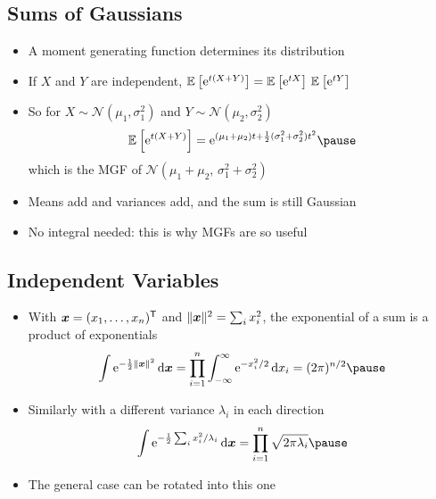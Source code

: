 \begin{slide}
\section[-1]{Sums of Gaussians}

\begin{PauseHighLight}
  \begin{itemize}
  \item A moment generating function determines its distribution\pause
  \item If $X$ and $Y$ are independent,
    $\mathbb{E}_{}\left[ {\rm e}^{t(X+Y)} \right] = \mathbb{E}_{}\left[ {\rm e}^{tX} \right]\,\mathbb{E}_{}\left[ {\rm e}^{tY} \right]$\pause
  \item So for $X\sim\mathcal{N}(\mu_1,\sigma_1^2)$ and
    $Y\sim\mathcal{N}(\mu_2,\sigma_2^2)$
    \begin{align*}
      \av{\e{t(X+Y)}} = \e{(\mu_1+\mu_2)t +
      \frac12(\sigma_1^2+\sigma_2^2)t^2}\pause
    \end{align*}
    which is the MGF of $\mathcal{N}(\mu_1+\mu_2,\,\sigma_1^2+\sigma_2^2)$\pause
  \item Means add and variances add, and the sum is still Gaussian\pause
  \item No integral needed: this is why MGFs are so useful\pause
  \end{itemize}
\end{PauseHighLight}

\end{slide}

\Outline %

\begin{slide}
\section[-2]{Independent Variables}

\begin{PauseHighLight}
  \begin{itemize}
  \item With $\bm{x} = (x_1,\ldots,x_n)^{\textsf{T}}$ and
    $\| \bm{x} \|^2 = \sum_i x_i^2$, the exponential of a sum is a
    product of exponentials
    \begin{align*}
      \int \e{-\frac12\len{\bm{x}}^2}\,\dd\bm{x}
      = \prod_{i=1}^n \int_{-\infty}^{\infty} \e{-x_i^2/2}\,\dd x_i
      = (2\pi)^{n/2}\pause
    \end{align*}
  \item Similarly with a different variance $\lambda_i$ in each
    direction
    \begin{align*}
      \int \e{-\frac12 \sum_i x_i^2/\lambda_i}\,\dd\bm{x}
      = \prod_{i=1}^n \sqrt{2\pi\lambda_i}\pause
    \end{align*}
  \item The general case can be rotated into this one\pause
  \end{itemize}
\end{PauseHighLight}

\end{slide}

